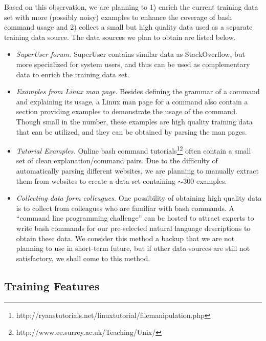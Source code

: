 Based on this observation, we are planning to 1) enrich the current training data set with more (possibly noisy) examples to enhance the coverage of bash command usage and 2) collect a small but high quality data used as a separate training data source. The data sources we plan to obtain are listed below.
\begin{itemize}\itemsep-1pt
\item \textit{SuperUser forum.} SuperUser contains similar data as StackOverflow, but more specialized for system users, and thus can be used as complementary data to enrich the training data set.
\item \textit{Examples from Linux man page.} Besides defining the grammar of a command and explaining its usage, a Linux man page for a command also contain a section providing examples to demonstrate the usage of the command. Though small in the number, these examples are high quality training data that can be utilized, and they can be obtained by parsing the man pages.
\item \textit{Tutorial Examples.} Online bash command tutorials\footnote{http://ryanstutorials.net/linuxtutorial/filemanipulation.php}\footnote{http://www.ee.surrey.ac.uk/Teaching/Unix/} often contain a small set of clean explanation/command pairs. Due to the difficulty of automatically parsing different websites, we are planning to manually extract them from websites to create a data set containing  $\sim$300 examples.
\item \textit{Collecting data form colleagues.} One possibility of obtaining high quality data is to collect from colleagues who are familiar with bash commands. A ``command line programming challenge'' can be hosted to attract experts to write bash commands for our pre-selected natural language descriptions to obtain these data. We consider this method a backup that we are not planning to use in short-term future, but if other data sources are still not satisfactory, we shall come to this method. 
\end{itemize}

\subsection{Training Features}
\label{future:features}

